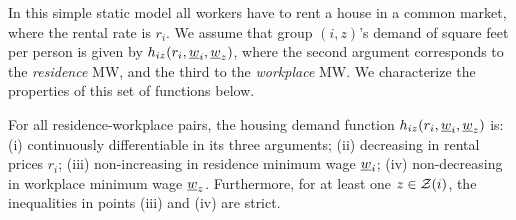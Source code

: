In this simple static model all workers have to rent a house in a common market, 
where the rental rate is $r_i$.
We assume that group $(i,z)$'s demand of square feet per person is given by $h_{iz}
(r_i, \underline{w}_i, \underline{w}_z)$, where the second argument corresponds to the \textit{residence} 
MW, and the third to the \textit{workplace} MW.
We characterize the properties of this set of functions below.

\begin{assu}\label{assu:housing_function}
    For all residence-workplace pairs, the housing demand function $h_{iz} (r_i, 	
    \underline{w}_i, \underline{w}_z)$ is:
    (i) continuously differentiable in its three arguments;
    (ii) decreasing in rental prices $r_i$;
    (iii) non-increasing in residence minimum wage $\underline{w}_i$;
    (iv) non-decreasing in workplace minimum wage $\underline{w}_z$.
    Furthermore, for at least one $z\in\mathcal{Z}(i)$, the inequalities in points (iii)
    and (iv) are strict.
\end{assu}

